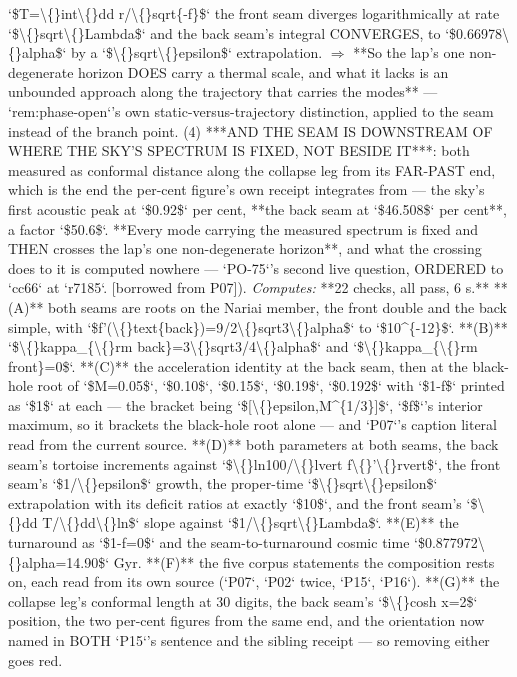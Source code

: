 \begin{description}
`\$T=\textbackslash\{\}int\textbackslash\{\}dd r/\textbackslash\{\}sqrt\{-f\}\$` the front seam diverges logarithmically at rate `\$\textbackslash\{\}sqrt\textbackslash\{\}Lambda\$` and the back seam's integral CONVERGES, to `\$0.66978\textbackslash\{\}alpha\$` by a `\$\textbackslash\{\}sqrt\textbackslash\{\}epsilon\$` extrapolation. \ensuremath{\Rightarrow} **So the lap's one non-degenerate horizon DOES carry a thermal scale, and what it lacks is an unbounded approach along the trajectory that carries the modes** --- `rem:phase-open`'s own static-versus-trajectory distinction, applied to the seam instead of the branch point. (4) ***AND THE SEAM IS DOWNSTREAM OF WHERE THE SKY'S SPECTRUM IS FIXED, NOT BESIDE IT***: both measured as conformal distance along the collapse leg from its FAR-PAST end, which is the end the per-cent figure's own receipt integrates from --- the sky's first acoustic peak at `\$0.92\$` per cent, **the back seam at `\$46.508\$` per cent**, a factor `\$50.6\$`. **Every mode carrying the measured spectrum is fixed and THEN crosses the lap's one non-degenerate horizon**, and what the crossing does to it is computed nowhere --- `PO-75`'s second live question, ORDERED to `cc66` at `r7185`. [borrowed from P07]). 
\emph{Computes:} **22 checks, all pass, 6 s.** **(A)** both seams are roots on the Nariai member, the front double and the back simple, with `\$f'(\textbackslash\{\}text\{back\})=9/2\textbackslash\{\}sqrt3\textbackslash\{\}alpha\$` to `\$10\textasciicircum{}\{-12\}\$`. **(B)** `\$\textbackslash\{\}kappa\_\{\textbackslash\{\}rm back\}=3\textbackslash\{\}sqrt3/4\textbackslash\{\}alpha\$` and `\$\textbackslash\{\}kappa\_\{\textbackslash\{\}rm front\}=0\$`. **(C)** the acceleration identity at the back seam, then at the black-hole root of `\$M=0.05\$`, `\$0.10\$`, `\$0.15\$`, `\$0.19\$`, `\$0.192\$` with `\$1-f\$` printed as `\$1\$` at each --- the bracket being `\$[\textbackslash\{\}epsilon,M\textasciicircum{}\{1/3\}]\$`, `\$f\$`'s interior maximum, so it brackets the black-hole root alone --- and `P07`'s caption literal read from the current source. **(D)** both parameters at both seams, the back seam's tortoise increments against `\$\textbackslash\{\}ln100/\textbackslash\{\}lvert f\textbackslash\{\}'\textbackslash\{\}rvert\$`, the front seam's `\$1/\textbackslash\{\}epsilon\$` growth, the proper-time `\$\textbackslash\{\}sqrt\textbackslash\{\}epsilon\$` extrapolation with its deficit ratios at exactly `\$10\$`, and the front seam's `\$\textbackslash\{\}dd T/\textbackslash\{\}dd\textbackslash\{\}ln\$` slope against `\$1/\textbackslash\{\}sqrt\textbackslash\{\}Lambda\$`. **(E)** the turnaround as `\$1-f=0\$` and the seam-to-turnaround cosmic time `\$0.877972\textbackslash\{\}alpha=14.90\$` Gyr. **(F)** the five corpus statements the composition rests on, each read from its own source (`P07`, `P02` twice, `P15`, `P16`). **(G)** the collapse leg's conformal length at 30 digits, the back seam's `\$\textbackslash\{\}cosh x=2\$` position, the two per-cent figures from the same end, and the orientation now named in BOTH `P15`'s sentence and the sibling receipt --- so removing either goes red.

\end{description}
